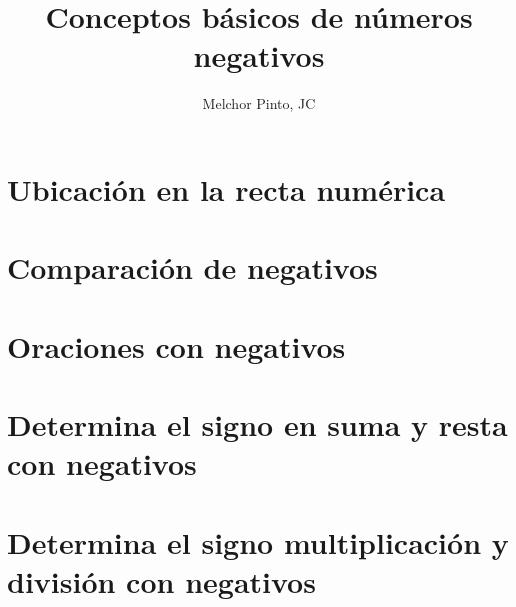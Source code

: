 \documentclass{guia}
\title{Conceptos básicos de números negativos}
\author{Melchor Pinto, JC}
\begin{document}
%
\begin{questions}
\section{Ubicación en la recta numérica}
\questionboxed{}
\section{Comparación de negativos}
\questionboxed{}
\section{Oraciones con negativos}
\questionboxed{}
\section{Determina el signo en suma y resta con negativos}
\questionboxed{}
\section{Determina el signo multiplicación y división con negativos}
\questionboxed{}

\end{questions}
\end{document}
